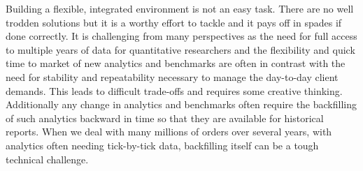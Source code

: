 Building a flexible, integrated environment is not an easy task. There are no well trodden solutions but it is a worthy effort to tackle and it pays off in spades if done correctly. It is challenging from many perspectives as the need for full access to multiple years of data  for quantitative researchers and the flexibility and quick time to market of new analytics and benchmarks are often in contrast with the need for stability and repeatability necessary to manage the day-to-day client demands. This leads to difficult trade-offs and requires some creative thinking. Additionally any change in analytics and benchmarks often require the backfilling of such analytics backward in time so that they are available for historical reports. When we deal with many millions of orders over several years, with analytics often needing tick-by-tick data, backfilling itself can be a tough technical challenge.


